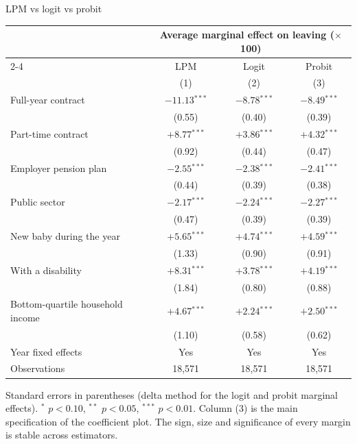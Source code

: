 \documentclass[aspectratio=169,11pt]{beamer}
\newcommand{\backbtn}[1]{\vfill\hfill\hyperlink{#1<1>}{\beamerreturnbutton{back}}}
\begin{document}
\begin{frame}[label=appmodels]{LPM vs logit vs probit}
  \begin{center}
  \scriptsize
  \begin{tabular}{lccc}
    \toprule
      & \multicolumn{3}{c}{Average marginal effect on leaving ($\times$100)} \\
    \cmidrule(lr){2-4}
      & LPM & Logit & Probit \\
      & (1) & (2) & (3) \\
    \midrule
    Full-year contract & $-11.13$$^{***}$ & $-8.78$$^{***}$ & $-8.49$$^{***}$ \\
      & (0.55) & (0.40) & (0.39) \\[0.25em]
    Part-time contract & $+8.77$$^{***}$ & $+3.86$$^{***}$ & $+4.32$$^{***}$ \\
      & (0.92) & (0.44) & (0.47) \\[0.25em]
    Employer pension plan & $-2.55$$^{***}$ & $-2.38$$^{***}$ & $-2.41$$^{***}$ \\
      & (0.44) & (0.39) & (0.38) \\[0.25em]
    Public sector & $-2.17$$^{***}$ & $-2.24$$^{***}$ & $-2.27$$^{***}$ \\
      & (0.47) & (0.39) & (0.39) \\[0.25em]
    New baby during the year & $+5.65$$^{***}$ & $+4.74$$^{***}$ & $+4.59$$^{***}$ \\
      & (1.33) & (0.90) & (0.91) \\[0.25em]
    With a disability & $+8.31$$^{***}$ & $+3.78$$^{***}$ & $+4.19$$^{***}$ \\
      & (1.84) & (0.80) & (0.88) \\[0.25em]
    Bottom-quartile household income & $+4.67$$^{***}$ & $+2.24$$^{***}$ & $+2.50$$^{***}$ \\
      & (1.10) & (0.58) & (0.62) \\
    \midrule
    Year fixed effects  & Yes & Yes & Yes \\
    Observations        & 18,571 & 18,571 & 18,571 \\
    \bottomrule
  \end{tabular}
  \end{center}
  \vspace{0.2em}
  {\tiny Standard errors in parentheses (delta method for the logit and
   probit marginal effects). $^{*}$ $p<0.10$, $^{**}$ $p<0.05$,
   $^{***}$ $p<0.01$. Column (3) is the main specification of the
   coefficient plot. The sign, size and significance of every margin is
   stable across estimators.}
  \backbtn{maineq}
\end{frame}
\end{document}
